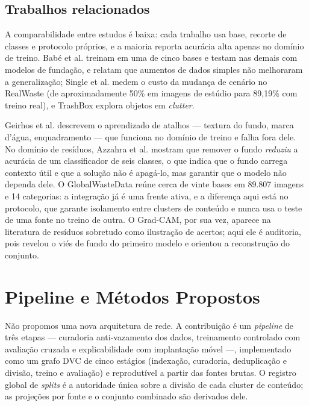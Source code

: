 \documentclass[11pt,a4paper]{article}
\begin{document}
	\subsection{Trabalhos relacionados}
	
	A comparabilidade entre estudos é baixa: cada trabalho usa base, recorte de classes e protocolo próprios, e a maioria reporta acurácia alta apenas no domínio de treino. Babé et al. \cite{babe2025} treinam em uma de cinco bases e testam nas demais com modelos de fundação, e relatam que aumentos de dados simples não melhoraram a generalização; Single et al. \cite{single2023} medem o custo da mudança de cenário no RealWaste (de aproximadamente 50\% em imagens de estúdio para 89,19\% com treino real), e TrashBox \cite{kumsetty2022} explora objetos em \textit{clutter}.
	
	Geirhos et al. \cite{geirhos2020} descrevem o aprendizado de atalhos --- textura do fundo, marca d'água, enquadramento --- que funciona no domínio de treino e falha fora dele. No domínio de resíduos, Azzahra et al. \cite{azzahra2026} mostram que remover o fundo \emph{reduziu} a acurácia de um classificador de seis classes, o que indica que o fundo carrega contexto útil e que a solução não é apagá-lo, mas garantir que o modelo não dependa dele. O GlobalWasteData \cite{ijaz2026} reúne cerca de vinte bases em 89.807 imagens e 14 categorias: a integração já é uma frente ativa, e a diferença aqui está no protocolo, que garante isolamento entre clusters de conteúdo e nunca usa o teste de uma fonte no treino de outra. O Grad-CAM, por sua vez, aparece na literatura de resíduos sobretudo como ilustração de acertos; aqui ele é auditoria, pois revelou o viés de fundo do primeiro modelo e orientou a reconstrução do conjunto.
	
	\section{Pipeline e Métodos Propostos}
	\label{sec:pipeline}
	
	Não propomos uma nova arquitetura de rede. A contribuição é um \textit{pipeline} de três etapas --- curadoria anti-vazamento dos dados, treinamento controlado com avaliação cruzada e explicabilidade com implantação móvel ---, implementado como um grafo DVC de cinco estágios (indexação, curadoria, deduplicação e divisão, treino e avaliação) e reprodutível a partir das fontes brutas. O registro global de \textit{splits} é a autoridade única sobre a divisão de cada cluster de conteúdo; as projeções por fonte e o conjunto combinado são derivados dele.
	
\end{document}
